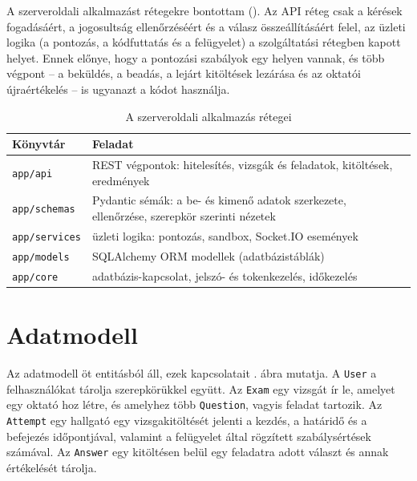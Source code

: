 A szerveroldali alkalmazást rétegekre bontottam (). Az API réteg csak a kérések
fogadásáért, a jogosultság ellenőrzéséért és a válasz összeállításáért felel, az üzleti logika
(a pontozás, a kódfuttatás és a felügyelet) a szolgáltatási rétegben kapott helyet. Ennek
előnye, hogy a pontozási szabályok egy helyen vannak, és több végpont -- a beküldés, a beadás, a
lejárt kitöltések lezárása és az oktatói újraértékelés -- is ugyanazt a kódot használja.

\begin{table}[H]
  \centering
  \caption{A szerveroldali alkalmazás rétegei}
  \label{tab:retegek}
  \begin{tabularx}{\textwidth}{@{}lX@{}}
    \toprule
    Könyvtár & Feladat \\
    \midrule
    \texttt{app/api}      & REST végpontok: hitelesítés, vizsgák és feladatok, kitöltések, eredmények \\
    \texttt{app/schemas}  & Pydantic sémák: a be- és kimenő adatok szerkezete, ellenőrzése, szerepkör szerinti nézetek \\
    \texttt{app/services} & üzleti logika: pontozás, sandbox, Socket.IO események \\
    \texttt{app/models}   & SQLAlchemy ORM modellek (adatbázistáblák) \\
    \texttt{app/core}     & adatbázis-kapcsolat, jelszó- és tokenkezelés, időkezelés \\
    \bottomrule
  \end{tabularx}
\end{table}

\section{Adatmodell}
\label{sec:adatmodell}

Az adatmodell öt entitásból áll, ezek kapcsolatait . ábra mutatja. A
\texttt{User} a felhasználókat tárolja szerepkörükkel együtt. Az \texttt{Exam} egy vizsgát ír le,
amelyet egy oktató hoz létre, és amelyhez több \texttt{Question}, vagyis feladat tartozik. Az
\texttt{Attempt} egy hallgató egy vizsgakitöltését jelenti a kezdés, a határidő és a befejezés
időpontjával, valamint a felügyelet által rögzített szabálysértések számával. Az \texttt{Answer}
egy kitöltésen belül egy feladatra adott választ és annak értékelését tárolja.

